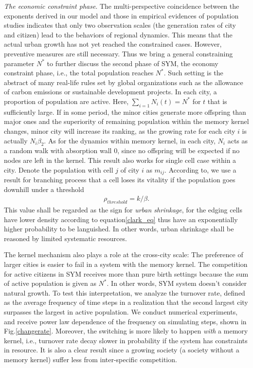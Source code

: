 \documentclass[reprint,unsortedaddress,amsmath,amssymb,aps,prl,showkeys]{revtex4-2}
\begin{document}
\textit{The economic constraint phase}. The multi-perspective coincidence between the exponents derived in our model and those in empirical evidences of population studies indicates that only two observation scales (the generation rates of city and citizen) lead to the behaviors of regional dynamics. This means that the actual urban growth has not yet reached the constrained cases. However, preventive measures are still necessary. Thus we bring a general constraining parameter $N^*$ to further discuss the second phase of SYM, the economy constraint phase, i.e., the total population reaches $N^*$. Such setting is the abstract of many real-life rules set by global organizations such as the allowance of carbon emissions or sustainable development projects. In each city, a proportion of population are active. Here, $\sum_{i=1} N_i(t) = N^*$ for $t$ that is sufficiently large. If in some period, the minor cities generate more offspring than major ones and the superiority of remaining population within the memory kernel changes, minor city will increase its ranking, as the growing rate for each city $i$ is actually $N_i\beta_2$. As for the dynamics within memory kernel, in each city, $N_i$ acts as a random walk with absorption wall $0$, since no offspring will be expected if no nodes are left in the kernel. This result also works for single cell case within a city. Denote the population with cell $j$ of city $i$ as $m_{ij}$. According to\@\cite{durrett1999essentials}, we use a result for branching process that a cell loses its vitality if the population goes downhill under a threshold \begin{align}\rho_{threshold} = k/\beta.\end{align} This value shall be regarded as the sign for \emph{urban shrinkage}, for the edging cells have lower density according to equation\@\ref{clark_eq} thus have an exponentially higher probability to be languished. In other words, urban shrinkage shall be reasoned by limited systematic resources. 

The kernel mechanism also plays a role at the cross-city scale: The preference of larger cities is easier to fail in a system with the memory kernel. The competition for active citizens in SYM receives more than pure birth settings because the sum of active population is given as $N^*$. In other words, SYM system doesn't consider natural growth. To test this interpretation, we analyze the turnover rate, defined as the average frequency of time steps in a realization that the second largest city surpasses the largest in active population. We conduct numerical experiments, and receive power law dependence of the frequency on simulating steps, shown in Fig.\@\ref{changerate}. Moreover, the switching is more likely to happen \textit{with} a memory kernel, i.e., turnover rate decay slower in probability if the system has constraints in resource. It is also a clear result since a growing society (a society without a memory kernel) suffer less from inter-specific competition.
\end{document}
